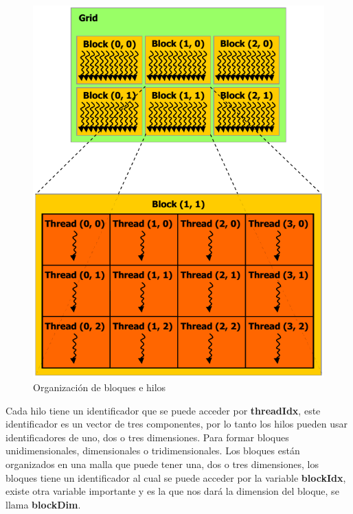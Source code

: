 \begin{figure}[h]
			\centering
				\includegraphics[scale=0.45]{img/grid_block.png}
			\caption{Organización de bloques e hilos \cite{Flops}}
\end{figure}


Cada hilo tiene un identificador que se puede acceder por \textbf{threadIdx}, este identificador es un vector de tres componentes, por lo tanto los hilos pueden usar identificadores de uno, dos o tres dimensiones. Para formar bloques unidimensionales, dimensionales o tridimensionales. Los bloques están organizados en una malla que puede tener una, dos o tres dimensiones, los bloques tiene un identificador al cual se puede acceder por la variable \textbf{blockIdx}, existe otra variable importante y es la que nos dará la dimension del bloque, se llama \textbf{blockDim}.\\\\\\\\ 

\pagebreak

